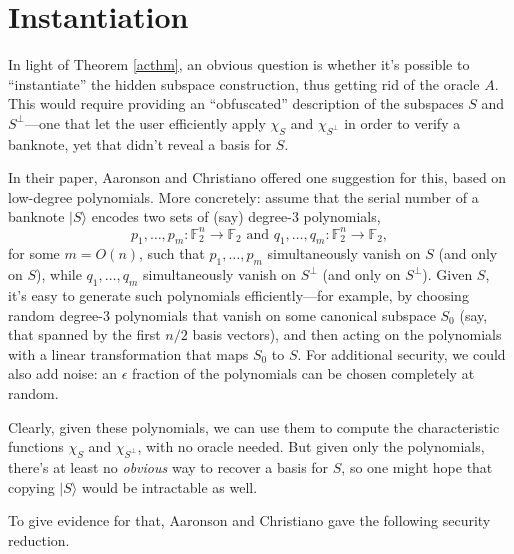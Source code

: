 \documentclass[12pt]{report}
\theoremstyle{plain}
\theoremstyle{definition}
\renewcommand{\ket}[1]{|#1\rangle}
\begin{document}
\section{Instantiation}

In light of Theorem \ref{acthm}, an obvious question is whether it's possible to ``instantiate'' the hidden subspace construction, thus getting rid of the oracle $A$.  This would require providing an ``obfuscated'' description of the subspaces $S$ and $S^\perp$---one that let the user efficiently apply $\chi_S$ and $\chi_{S^\perp}$ in order to verify a banknote, yet that didn't reveal a basis for $S$.

In their paper, Aaronson and Christiano \cite{achristiano} offered one suggestion for this, based on low-degree polynomials.  More concretely: assume that the serial number of a banknote $\ket{S}$ encodes two sets of (say) degree-$3$ polynomials,
$$p_1,\ldots,p_m: \mathbb F_2^n\to \mathbb F_2\text{  and  }q_1,\ldots,q_m: \mathbb F_2^n\to \mathbb F_2,$$
for some $m=O(n)$, such that $p_1,\ldots,p_m$ simultaneously vanish on $S$ (and only on $S$), while $q_1,\ldots,q_m$ simultaneously vanish on $S^\perp$ (and only on $S^\perp$).  Given $S$, it's easy to generate such polynomials efficiently---for example, by choosing random degree-$3$ polynomials that vanish on some canonical subspace $S_0$ (say, that spanned by the first $n/2$ basis vectors), and then acting on the polynomials with a linear transformation that maps $S_0$ to $S$.  For additional security, we could also add noise: an $\epsilon$ fraction of the polynomials can be chosen completely at random.

Clearly, given these polynomials, we can use them to compute the characteristic functions $\chi_S$ and $\chi_{S^\perp}$, with no oracle needed.  But given only the polynomials, there's at least no {\em obvious} way to recover a basis for $S$, so one might hope that copying $\ket{S}$ would be intractable as well.

To give evidence for that, Aaronson and Christiano \cite{achristiano} gave the following security reduction.
\end{document}
